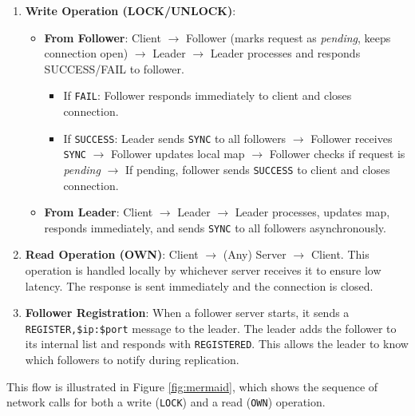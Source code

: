 \documentclass[a4paper,11pt]{article}
\begin{document}
\begin{enumerate}
    \item \textbf{Write Operation (LOCK/UNLOCK)}: 
    \begin{itemize}
        \item \textbf{From Follower}: Client $\rightarrow$ Follower (marks request as \emph{pending}, keeps connection open) $\rightarrow$ Leader $\rightarrow$ Leader processes and responds SUCCESS/FAIL to follower. 
        \begin{itemize}
            \item If \texttt{FAIL}: Follower responds immediately to client and closes connection.
            \item If \texttt{SUCCESS}: Leader sends \texttt{SYNC} to all followers $\rightarrow$ Follower receives \texttt{SYNC} $\rightarrow$ Follower updates local map $\rightarrow$ Follower checks if request is \emph{pending} $\rightarrow$ If pending, follower sends \texttt{SUCCESS} to client and closes connection.
        \end{itemize}
        \item \textbf{From Leader}: Client $\rightarrow$ Leader $\rightarrow$ Leader processes, updates map, responds immediately, and sends \texttt{SYNC} to all followers asynchronously.
    \end{itemize}
    \item \textbf{Read Operation (OWN)}: Client $\rightarrow$ (Any) Server $\rightarrow$ Client. This operation is handled locally by whichever server receives it to ensure low latency. The response is sent immediately and the connection is closed.
    \item \textbf{Follower Registration}: When a follower server starts, it sends a \texttt{REGISTER,\$ip:\$port} message to the leader. The leader adds the follower to its internal list and responds with \texttt{REGISTERED}. This allows the leader to know which followers to notify during replication.
\end{enumerate}

This flow is illustrated in Figure \ref{fig:mermaid}, which shows the sequence of network calls for both a write (\texttt{LOCK}) and a read (\texttt{OWN}) operation.
\end{document}
